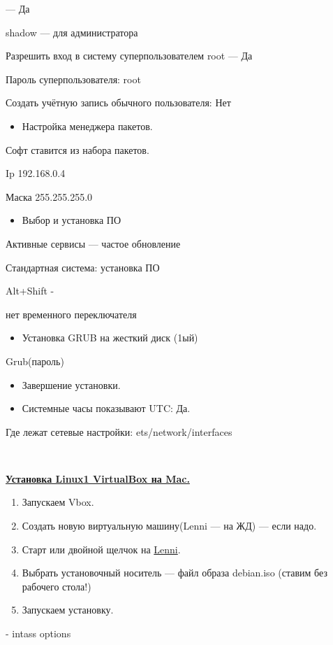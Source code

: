 — Да
\par 
shadow — для администратора
\par 
Разрешить вход в систему суперпользователем
root — Да
\par 
Пароль суперпользователя: root
\par 
Создать учётную запись обычного
пользователя: Нет
\begin{itemize}
	\item \par 
	Настройка менеджера пакетов.
\end{itemize}
\par 
Софт ставится из набора пакетов.
\par 
Ip 192.168.0.4
\par 
Маска 255.255.255.0
\begin{itemize}
	\item \par 
	Выбор и установка ПО
\end{itemize}
\par 
Активные сервисы — частое обновление
\par 
Стандартная система: установка ПО
\par 
Alt+Shift -
\par 
нет временного переключателя
\begin{itemize}
	\item \par 
	Установка GRUB на жесткий диск (1ый)
\end{itemize}
\par 
Grub(пароль)
\begin{itemize}
	\item \par 
	Завершение установки.
\end{itemize}
\begin{itemize}
	\item \par 
	Системные часы показывают UTC: Да.
\end{itemize}
\par 
Где лежат сетевые настройки:
ets/network/interfaces
\par 
\\

\par 
\underline{\textbf{Установка Linux1 VirtualBox на Mac.}}
\begin{enumerate}
	\item \par 
	Запускаем Vbox.
	\item \par 
	Создать новую виртуальную машину(Lenni
	— на ЖД) — если надо.
	\item \par Старт
	или двойной щелчок на \underline{Lenni}.
	\item \par 
	Выбрать установочный носитель — файл
	образа debian.iso (ставим без рабочего
	стола!)
	\item \par 
	Запускаем установку.
\end{enumerate}
\par 
- intass options 


